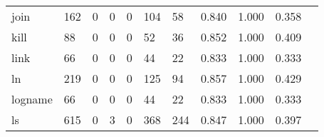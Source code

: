 \begin{longtable}{lp{1.2cm}p{1.2cm}p{1.2cm}p{1.2cm}p{1.2cm}p{1.2cm}p{1.2cm}p{1.2cm}p{1.2cm}p{1.2cm}}
join      &                                   162 &                                                  0 &                                                  0 &                                                  0 &                                                104 &                                                 58 &                                         0.840 &                                              1.000 &                                              0.358 \\
kill      &                                    88 &                                                  0 &                                                  0 &                                                  0 &                                                 52 &                                                 36 &                                         0.852 &                                              1.000 &                                              0.409 \\
link      &                                    66 &                                                  0 &                                                  0 &                                                  0 &                                                 44 &                                                 22 &                                         0.833 &                                              1.000 &                                              0.333 \\
ln        &                                   219 &                                                  0 &                                                  0 &                                                  0 &                                                125 &                                                 94 &                                         0.857 &                                              1.000 &                                              0.429 \\
logname   &                                    66 &                                                  0 &                                                  0 &                                                  0 &                                                 44 &                                                 22 &                                         0.833 &                                              1.000 &                                              0.333 \\
ls        &                                   615 &                                                  0 &                                                  3 &                                                  0 &                                                368 &                                                244 &                                         0.847 &                                              1.000 &                                              0.397 \\

\end{longtable}
